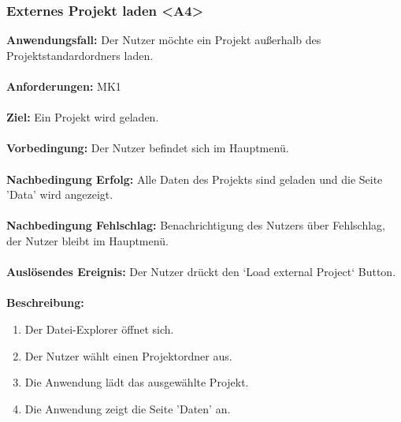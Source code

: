 \documentclass[parskip=full]{scrartcl} %
\begin{document}
\subsubsection*{Externes Projekt laden <A4>}
\textbf{Anwendungsfall:} Der Nutzer möchte ein Projekt außerhalb des Projektstandardordners laden.\\\\
\textbf{Anforderungen:} MK1\\\\
\textbf{Ziel:} Ein Projekt wird geladen. \\\\
\textbf{Vorbedingung:} Der Nutzer befindet sich im Hauptmenü.  \\\\
\textbf{Nachbedingung Erfolg:} Alle Daten des Projekts sind geladen und die Seite 'Data' wird angezeigt. \\\\
\textbf{Nachbedingung Fehlschlag:} Benachrichtigung des Nutzers über Fehlschlag, der Nutzer bleibt im Hauptmenü. \\\\
\textbf{Auslösendes Ereignis:}  Der Nutzer drückt den `Load external Project` Button. \\\\
\textbf{Beschreibung:}
\begin{enumerate}
    \item Der Datei-Explorer öffnet sich.
    \item Der Nutzer wählt einen Projektordner aus.
    \item Die Anwendung lädt das ausgewählte Projekt.
    \item Die Anwendung zeigt die Seite 'Daten' an.
\end{enumerate}
\newpage
\end{document}
